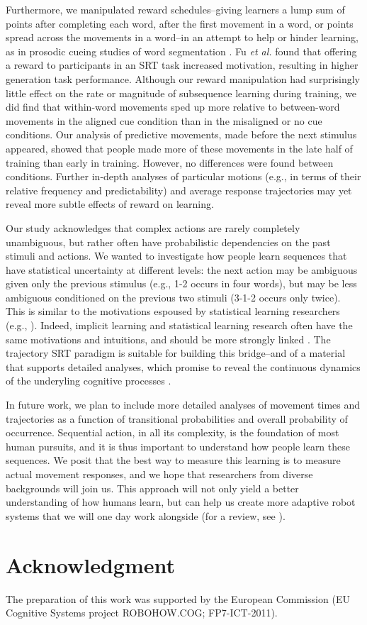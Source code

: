 \documentclass[conference]{IEEEtran}
\begin{document}
Furthermore, we manipulated reward schedules--giving learners a lump sum of points after completing each word, after the first movement in a word, or points spread across the movements in a word--in an attempt to help or hinder learning, as in prosodic cueing studies of word segmentation \cite{Saffran:1996}. Fu \textit{et al.} \cite{Fu:2008} found that offering a reward to participants in an SRT task increased motivation, resulting in higher generation task performance. Although our reward manipulation had surprisingly little effect on the rate or magnitude of subsequence learning during training, we did find that within-word movements sped up more relative to between-word movements in the aligned cue condition than in the misaligned or no cue conditions. Our analysis of predictive movements, made before the next stimulus appeared, showed that people made more of these movements in the late half of training than early in training. However, no differences were found between conditions. Further in-depth analyses of particular motions (e.g., in terms of their relative frequency and predictability) and average response trajectories may yet reveal more subtle effects of reward on learning.

Our study acknowledges that complex actions are rarely completely unambiguous, but rather often have probabilistic dependencies on the past stimuli and actions. We wanted to investigate how people learn sequences that have statistical uncertainty at different levels: the next action may be ambiguous given only the previous stimulus (e.g., 1-2 occurs in four words), but may be less ambiguous conditioned on the previous two stimuli (3-1-2 occurs only twice). This is similar to the motivations espoused by statistical learning researchers (e.g., \cite{Saffran:1996}). Indeed, implicit learning and statistical learning research often have the same motivations and intuitions, and should be more strongly linked \cite{Perruchet:2006}. The trajectory SRT paradigm is suitable for building this bridge--and of a material that supports detailed analyses, which promise to reveal the continuous dynamics of the underyling cognitive processes \cite{Spivey:2006,Kachergis:2011g}.

In future work, we plan to include more detailed analyses of movement times and trajectories as a function of transitional probabilities and overall probability of occurrence. Sequential action, in all its complexity, is the foundation of most human pursuits, and it is thus important to understand how people learn these sequences. We posit that the best way to measure this learning is to measure actual movement responses, and we hope that researchers from diverse backgrounds will join us. This approach will not only yield a better understanding of how humans learn, but can help us create more adaptive robot systems that we will one day work alongside (for a review, see \cite{deKleijn:2014}).


\section*{Acknowledgment}

The preparation of this work was supported by the European Commission (EU Cognitive Systems project ROBOHOW.COG; FP7-ICT-2011).





\end{document}
